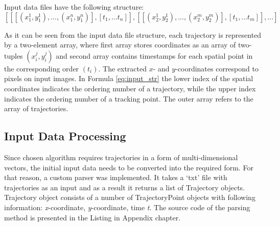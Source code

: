 Input data files have the following structure:
\begin{equation} \label{eq:input_str}
	[[[(x_1^1, y_1^1), ..., (x_1^n, y_1^n)], [t_1, ... t_n]], [[(x_2^1, y_2^1), ..., (x_2^m, y_2^m)], [t_1, ... t_m]], ...]
\end{equation}

As it can be seen from the input data file structure, each trajectory is represented by a two-element array, where first array stores coordinates as an array of two-tuples $(x_i^j, y_i^j)$ and second array contains timestamps for each spatial point in the corresponding order $(t_i)$. The extracted $x$- and $y$-coordinates correspond to pixels on input images. In Formula \ref{eq:input_str} the lower index of the spatial coordinates indicates the ordering number of a trajectory, while the upper index indicates the ordering number of a tracking point. The outer array refers to the array of trajectories.


\subsection{Input Data Processing}
Since chosen algorithm requires trajectories in a form of multi-dimensional vectors, the initial input data needs to be converted into the required form. For that reason, a custom parser was implemented. It takes a ‘txt’ file with trajectories as an input and as a result it returns a list of Trajectory objects. Trajectory object consists of a number of TrajectoryPoint objects with following information: \textit{x}-coordinate, \textit{y}-coordinate, time \textit{t}. The source code of the parsing method is presented in the Listing in Appendix chapter.